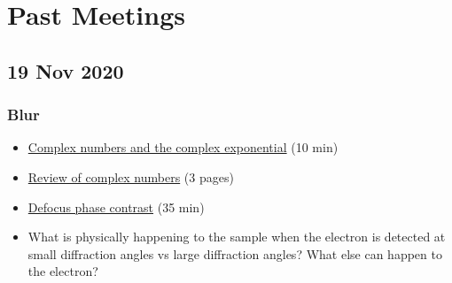 \documentclass[11pt, oneside]{article}   	%
\begin{document}
\pagebreak
\section{Past Meetings}


\subsection{19 Nov 2020}
\subsubsection{Blur}
\begin{itemize}
\item \href{https://youtu.be/CZkPG95eoS0}{Complex numbers and the complex exponential} (10 min)
\item \href{https://cryoemprinciples.yale.edu/sites/default/files/files/1%20Review%20of%20Complex%20Numbers.pdf}{Review	of complex	numbers} (3 pages)
\item \href{https://youtu.be/m2Hm1ziZFZg}{Defocus phase contrast} (35 min)

\end{itemize}
\begin{itemize}
\item What is physically happening to the sample when the electron is detected at small diffraction angles vs large diffraction angles? What else can happen to the electron?
\end{itemize}
\end{document}
